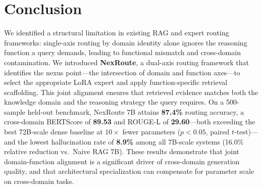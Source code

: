 \documentclass[a4paper,fleql]{cas-sc}
\begin{document}
\section{Conclusion}
\label{sec:conclusion}
We identified a structural limitation in existing RAG and expert routing
frameworks: single-axis routing by domain identity alone ignores the
reasoning function a query demands, leading to functional mismatch and
cross-domain contamination.
We introduced \textbf{NexRoute}, a dual-axis routing framework that identifies
the nexus point---the intersection of domain and function axes---to select
the appropriate LoRA expert and apply function-specific retrieval scaffolding.
This joint alignment ensures that retrieved evidence matches both the
knowledge domain and the reasoning strategy the query requires.
On a 500-sample held-out benchmark, NexRoute 7B attains \textbf{87.4\%}
routing accuracy, a cross-domain BERTScore of \textbf{89.53} and ROUGE-L of
\textbf{29.60}---both exceeding the best 72B-scale dense baseline at
$10\times$ fewer parameters ($p < 0.05$, paired $t$-test)---and the lowest
hallucination rate of \textbf{8.9\%} among all 7B-scale systems (16.0\%
relative reduction vs.\ Naive RAG 7B). These results demonstrate that
joint domain-function alignment is a significant driver of cross-domain
generation quality, and that architectural specialization can compensate for
parameter scale on cross-domain tasks.

\printcredits
\end{document}
